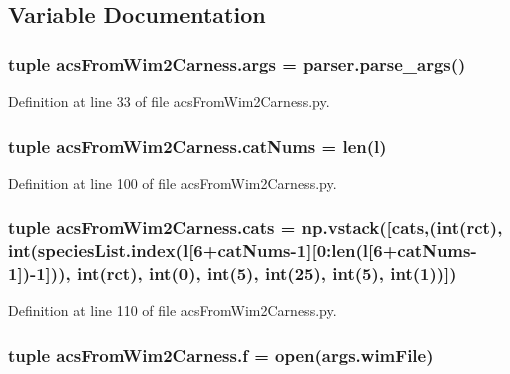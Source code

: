 \subsection{Variable Documentation}
\hypertarget{a00094_ac4c461267ee7f11bbe525de64f56cd10}{
\subsubsection[{args}]{\setlength{\rightskip}{0pt plus 5cm}tuple acs\-From\-Wim2\-Carness.\-args = parser.\-parse\-\_\-args()}}\label{a00094_ac4c461267ee7f11bbe525de64f56cd10}


Definition at line 33 of file acs\-From\-Wim2\-Carness.\-py.

\hypertarget{a00094_a0d474343423a1a87a760dd91411f96b4}{
\subsubsection[{cat\-Nums}]{\setlength{\rightskip}{0pt plus 5cm}tuple acs\-From\-Wim2\-Carness.\-cat\-Nums = len({\bf l})}}\label{a00094_a0d474343423a1a87a760dd91411f96b4}


Definition at line 100 of file acs\-From\-Wim2\-Carness.\-py.

\hypertarget{a00094_aea4d714ca7ceaba151380b3aed7c34d8}{
\subsubsection[{cats}]{\setlength{\rightskip}{0pt plus 5cm}tuple acs\-From\-Wim2\-Carness.\-cats = np.\-vstack(\mbox{[}cats,(int({\bf rct}), int({\bf species\-List.\-index}({\bf l}\mbox{[}6+{\bf cat\-Nums}-\/1\mbox{]}\mbox{[}0\-:len({\bf l}\mbox{[}6+{\bf cat\-Nums}-\/1\mbox{]})-\/1\mbox{]})), int({\bf rct}), int(0), int(5), int(25), int(5), int(1))\mbox{]})}}\label{a00094_aea4d714ca7ceaba151380b3aed7c34d8}


Definition at line 110 of file acs\-From\-Wim2\-Carness.\-py.

\hypertarget{a00094_ab599c65fad60b9c6ccc220002ce8f89c}{
\subsubsection[{f}]{\setlength{\rightskip}{0pt plus 5cm}tuple acs\-From\-Wim2\-Carness.\-f = open(args.\-wim\-File)}}\label{a00094_ab599c65fad60b9c6ccc220002ce8f89c}


